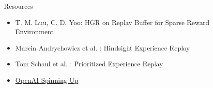 \documentclass{beamer}
\begin{document}
      \begin{frame}{Resources}
            \begin{itemize}
                  \item T. M. Luu, C. D. Yoo: HGR on Replay Buffer for Sparse Reward Environment
                  \item Marcin Andrychowicz et al. : Hindsight Experience Replay
                  \item Tom Schaul et al. : Prioritized Experience Replay
                  \item \href{https://spinningup.openai.com/en/latest/algorithms/ddpg.html}{OpenAI Spinning Up}
            \end{itemize}
      \end{frame}

\backmatter
\end{document}
